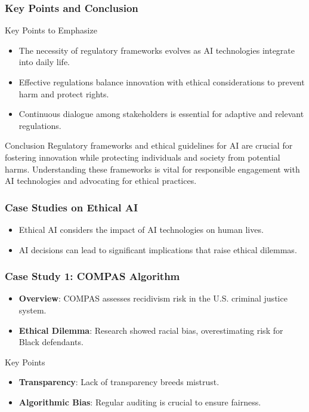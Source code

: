 \documentclass{beamer}
\begin{document}
\begin{frame}[fragile]
    \frametitle{Key Points and Conclusion}
    \begin{block}{Key Points to Emphasize}
        \begin{itemize}
            \item The necessity of regulatory frameworks evolves as AI technologies integrate into daily life.
            \item Effective regulations balance innovation with ethical considerations to prevent harm and protect rights.
            \item Continuous dialogue among stakeholders is essential for adaptive and relevant regulations.
        \end{itemize}
    \end{block}
    
    \begin{block}{Conclusion}
        Regulatory frameworks and ethical guidelines for AI are crucial for fostering innovation while protecting individuals and society from potential harms. Understanding these frameworks is vital for responsible engagement with AI technologies and advocating for ethical practices.
    \end{block}
\end{frame}

\begin{frame}[fragile]
    \frametitle{Case Studies on Ethical AI}
    \begin{itemize}
        \item Ethical AI considers the impact of AI technologies on human lives.
        \item AI decisions can lead to significant implications that raise ethical dilemmas.
    \end{itemize}
\end{frame}

\begin{frame}[fragile]
    \frametitle{Case Study 1: COMPAS Algorithm}
    \begin{itemize}
        \item \textbf{Overview}: COMPAS assesses recidivism risk in the U.S. criminal justice system.
        \item \textbf{Ethical Dilemma}: Research showed racial bias, overestimating risk for Black defendants.
    \end{itemize}
    
    \begin{block}{Key Points}
        \begin{itemize}
            \item \textbf{Transparency}: Lack of transparency breeds mistrust.
            \item \textbf{Algorithmic Bias}: Regular auditing is crucial to ensure fairness.
        \end{itemize}
    \end{block}
\end{frame}
\end{document}
